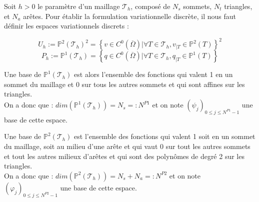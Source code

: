 \documentclass[a4paper,12pt]{article}
\begin{document}
Soit $h > 0$ le paramètre d'un maillage $\mathcal{T}_{h}$, composé de $N_{s}$ sommets, $N_{t}$ triangles, et $N_{a}$ arêtes. Pour établir la formulation variationnelle discrète, il nous faut définir les espaces variationnels discrets :

\begin{equation}
U_{h} := \mathbb{P}^{2} \left( \mathcal{T}_{h} \right)^{2} = \left \{ v \in C^{0}\left( \overline{\Omega} \right) | \forall T \in \mathcal{T}_{h}, v_{|T} \in \mathbb{P}^{2}\left( T \right) \right \}^{2}
\end{equation}
\begin{equation}
P_{h} := \mathbb{P}^{1} \left( \mathcal{T}_{h} \right) = \left \{  q \in C^{0} \left( \overline{\Omega} \right) | \forall T \in \mathcal{T}_{h}, q_{|T} \in \mathbb{P}^{1}\left( T \right)  \right \}
\end{equation}

Une base de $\mathbb{P}^{1} \left( \mathcal{T}_{h} \right)$ est alors l'ensemble des fonctions qui valent 1 en un sommet du maillage et 0 sur tous les autres sommets et qui sont affines sur les triangles.\\
On a donc que : $dim(\mathbb{P}^{1} \left( \mathcal{T}_{h} \right))=N_{s} =: N^{P1}$ et on note $\left( \psi_{j} \right)_{0 \leq j \leq N^{P1}-1}$ une base de cette espace.

Une base de $\mathbb{P}^{2} \left( \mathcal{T}_{h} \right)$ est l'ensemble des fonctions qui valent 1 soit en un sommet du maillage, soit au milieu d'une arête et qui vaut 0 sur tout les autres sommets et tout les autres milieux d'arêtes et qui sont des polynômes de degré 2 sur les triangles.\\
On a donc que : $dim(\mathbb{P}^{2} \left( \mathcal{T}_{h} \right)) = N_{s}+N_{a} =: N^{P2}$ et on note $\left( \varphi_{j} \right)_{0 \leq j \leq N^{P2}-1}$ une base de cette espace.
\end{document}
